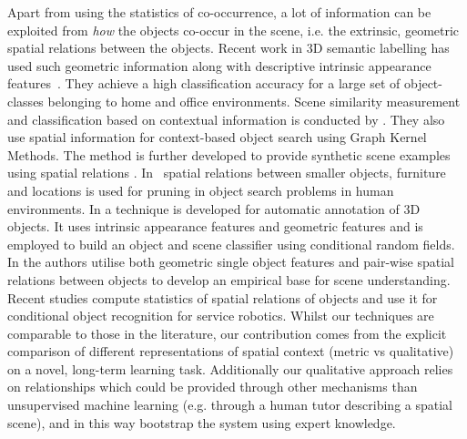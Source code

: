 \documentclass[letterpaper]{article}
\begin{document}
Apart from using the statistics of co-occurrence, a lot of information can be exploited from \textit{how} the objects co-occur in the scene, i.e. the extrinsic, geometric spatial relations between the objects. Recent work in 3D semantic labelling has used such geometric information along with descriptive intrinsic appearance features~\cite{Koppula:NIPS2011}. They achieve a high classification accuracy for a large set of object-classes belonging to home and office environments. Scene similarity measurement and classification based on contextual information is conducted by \cite{Fisher:ACMT2011}. They also use spatial information for context-based object search using Graph Kernel Methods. The method is further developed to provide synthetic scene examples using spatial relations \cite{Fisher:ACMT2012}. In~\cite{Aydemir:ICRA2011} spatial relations between smaller objects, furniture and locations is used for pruning in object search problems in human environments. In \cite{Lin:ICCV2013} a technique is developed for automatic annotation of 3D objects. It uses intrinsic appearance features and geometric features and is employed to build an object and scene classifier using conditional random fields. In \cite{kasper:2011} the authors utilise both geometric single object features and pair-wise spatial relations between objects to develop an empirical base for scene understanding. Recent studies \cite{Southey:2007,kasper:2011} compute statistics of spatial relations of objects and use it for conditional object recognition for service robotics. Whilst our techniques are comparable to those in the literature, our contribution comes from the explicit comparison of different representations of spatial context (metric vs qualitative) on a novel, long-term learning task. Additionally our qualitative approach relies on relationships which could be provided through other mechanisms than unsupervised machine learning (e.g. through a human tutor describing a spatial scene), and in this way bootstrap the system using expert knowledge.
\end{document}
